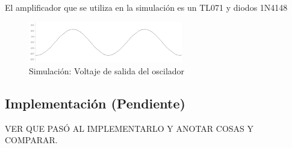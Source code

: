 
El amplificador que se utiliza en la simulación es un TL071 y diodos 1N4148
\begin{figure}[H]
	\centering
	\includegraphics[width=0.6\textwidth]{Oscilador/salida_simulada.png}
	\caption{Simulación: Voltaje de salida del oscilador}
	\label{sim:Vosc}
\end{figure}
\subsection{Implementación (Pendiente)}
VER QUE PASÓ AL IMPLEMENTARLO Y ANOTAR COSAS Y COMPARAR.


